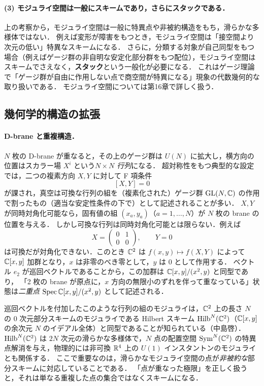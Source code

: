 \paragraph{(3) モジュライ空間は一般にスキームであり，さらにスタックである．}
上の考察から，モジュライ空間は一般に特異点や非被約構造をもち，滑らかな多様体ではない．
例えば変形が障害をもつとき，モジュライ空間は「接空間より次元の低い」特異なスキームになる．
さらに，分類する対象が自己同型をもつ場合（例えばゲージ群の非自明な安定化部分群をもつ配位），モジュライ空間はスキームでさえなく，\textbf{スタック}という一般化が必要になる．
これはゲージ理論で「ゲージ群が自由に作用しない点で商空間が特異になる」現象の代数幾何的な取り扱いである．
モジュライ空間については第16章で詳しく扱う．

\subsection{幾何学的構造の拡張}

\paragraph{D-brane と重複構造．}
$N$ 枚の D-brane が重なると，その上のゲージ群は $U(N)$ に拡大し，横方向の位置はスカラー場 $X^i$ という\emph{$N\times N$ 行列}になる．
超対称性をもつ典型的な設定では，二つの複素方向 $X,Y$ に対して F 項条件
\[
  [X,Y]=0
\]
が課され，真空は可換な行列の組を（複素化された）ゲージ群 $\operatorname{GL}(N,\mathbb{C})$ の作用で割ったもの（適当な安定性条件の下で）として記述されることが多い．
$X,Y$ が同時対角化可能なら，固有値の組 $(x_a,y_a)$（$a=1,\dots,N$）が $N$ 枚の brane の位置を与える．
しかし可換な行列は同時対角化可能とは限らない．例えば
\[
  X=\begin{pmatrix}0&1\\0&0\end{pmatrix},\qquad Y=0
\]
は可換だが対角化できない．このとき $\mathbb{C}^2$ は $f(x,y)\mapsto f(X,Y)$ によって $\mathbb{C}[x,y]$ 加群となり，$x$ は非零のべき零として，$y$ は $0$ として作用する．
ベクトル $e_2$ が巡回ベクトルであることから，この加群は $\mathbb{C}[x,y]/(x^2,y)$ と同型であり，
「2 枚の brane が原点に，$x$ 方向の無限小のずれを伴って重なっている」状態は\emph{二重点 $\operatorname{Spec}\mathbb{C}[x,y]/(x^2,y)$} として記述される．

巡回ベクトルを付加したこのような行列の組のモジュライは，$\mathbb{C}^2$ 上の長さ $N$ の 0 次元部分スキームのモジュライである Hilbert スキーム $\mathrm{Hilb}^N(\mathbb{C}^2)$（$\mathbb{C}[x,y]$ の余次元 $N$ のイデアル全体）と同型であることが知られている（中島啓）．
$\mathrm{Hilb}^N(\mathbb{C}^2)$ は $2N$ 次元の滑らかな多様体で，$N$ 点の配置空間 $\mathrm{Sym}^N(\mathbb{C}^2)$ の特異点解消を与え，物理的には非可換 $\mathbb{R}^4$ 上の $U(1)$ インスタントンのモジュライとも関係する．
ここで重要なのは，滑らかなモジュライ空間の点が\emph{非被約な}部分スキームに対応していることである．
「点が重なった極限」を正しく扱うと，それは単なる重複した点の集合ではなくスキームになる．

